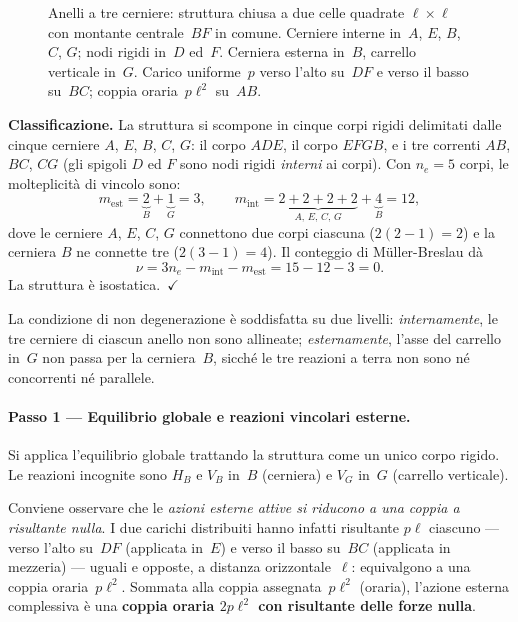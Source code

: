\begin{figure}[htbp]
	\caption{Anelli a tre cerniere: struttura chiusa a due celle
		quadrate $\ell\times\ell$ con montante centrale~$BF$ in
		comune. Cerniere interne in~$A$, $E$, $B$, $C$, $G$;
		nodi rigidi in~$D$ ed~$F$. Cerniera esterna in~$B$,
		carrello verticale in~$G$. Carico uniforme~$p$ verso
		l'alto su~$DF$ e verso il basso su~$BC$; coppia oraria~$p\ell^2$
		su~$AB$.}
	\label{fig:anello3c_schema}
\end{figure}


\noindent\textbf{Classificazione.}
La struttura si scompone in cinque corpi rigidi delimitati
dalle cinque cerniere $A$, $E$, $B$, $C$, $G$: il corpo
$ADE$, il corpo $EFGB$, e i tre correnti $AB$, $BC$, $CG$
(gli spigoli $D$ ed $F$ sono nodi rigidi \emph{interni}
ai corpi). Con $n_e = 5$ corpi, le molteplicità di vincolo
sono:
\[
m_{\mathrm{est}} = \underbrace{2}_{B} + \underbrace{1}_{G} = 3,
\qquad
m_{\mathrm{int}} = \underbrace{2+2+2+2}_{A,\,E,\,C,\,G}
+ \underbrace{4}_{B} = 12,
\]
dove le cerniere $A$, $E$, $C$, $G$ connettono due corpi
ciascuna ($2(2-1)=2$) e la cerniera $B$ ne connette tre
($2(3-1)=4$). Il conteggio di Müller-Breslau dà
\[
\nu = 3n_e - m_{\mathrm{int}} - m_{\mathrm{est}}
= 15 - 12 - 3 = 0.
\]
La struttura è isostatica.~$\checkmark$

La condizione di non degenerazione è soddisfatta su due
livelli: \emph{internamente}, le tre cerniere di ciascun
anello non sono allineate; \emph{esternamente}, l'asse del
carrello in~$G$ non passa per la cerniera~$B$, sicché le
tre reazioni a terra non sono né concorrenti né parallele.

\paragraph{Passo 1 --- Equilibrio globale e
	reazioni vincolari esterne.}

Si applica l'equilibrio globale trattando la struttura
come un unico corpo rigido. Le reazioni incognite sono
$H_B$ e $V_B$ in~$B$ (cerniera) e $V_G$ in~$G$ (carrello
verticale).

Conviene osservare che le \emph{azioni esterne attive si
	riducono a una coppia a risultante nulla}. I due carichi
distribuiti hanno infatti risultante $p\ell$ ciascuno ---
verso l'alto su~$DF$ (applicata in~$E$) e verso il basso
su~$BC$ (applicata in mezzeria) --- uguali e opposte, a
distanza orizzontale~$\ell$: equivalgono a una coppia
oraria~$p\ell^2$. Sommata alla coppia assegnata~$p\ell^2$
(oraria), l'azione esterna complessiva è una \textbf{coppia
	oraria $2p\ell^2$ con risultante delle forze nulla}.

